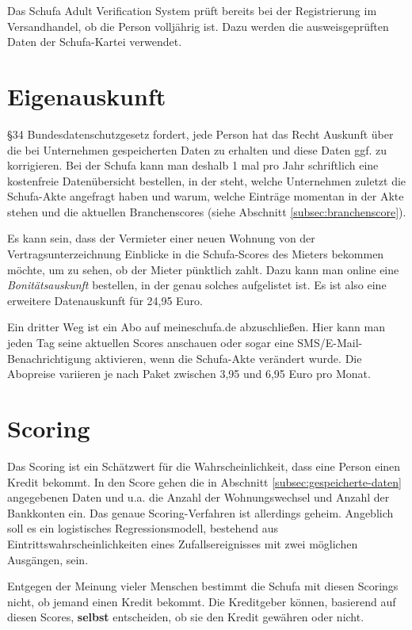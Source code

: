 \documentclass[12pt]{article}
\begin{document}
Das Schufa Adult Verification System prüft bereits bei der Registrierung im Versandhandel, ob die Person volljährig ist. Dazu werden die ausweisgeprüften Daten der Schufa-Kartei verwendet.




\section{Eigenauskunft}
\label{sec:eigenauskunft}
§34 Bundesdatenschutzgesetz fordert, jede Person hat das Recht Auskunft über die bei Unternehmen gespeicherten Daten zu erhalten und diese Daten ggf. zu korrigieren.
Bei der Schufa kann man deshalb 1 mal pro Jahr schriftlich eine kostenfreie Datenübersicht bestellen, in der steht, welche Unternehmen zuletzt die Schufa-Akte angefragt haben und warum, welche Einträge momentan 
in der Akte stehen und die aktuellen Branchenscores (siehe Abschnitt \ref{subsec:branchenscore}).

Es kann sein, dass der Vermieter einer neuen Wohnung von der Vertragsunterzeichnung Einblicke in die Schufa-Scores des Mieters bekommen möchte, um zu sehen, ob der Mieter pünktlich zahlt.
Dazu kann man online eine \textit{Bonitätsauskunft} bestellen, in der genau solches aufgelistet ist. Es ist also eine erweitere Datenauskunft für 24,95 Euro.

Ein dritter Weg ist ein Abo auf meineschufa.de abzuschließen. Hier kann man jeden Tag seine aktuellen Scores anschauen oder sogar eine SMS/E-Mail-Benachrichtigung aktivieren, wenn die Schufa-Akte 
verändert wurde.
Die Abopreise variieren je nach Paket zwischen 3,95 und 6,95 Euro pro Monat.






\section{Scoring}
\label{sec:scoring}
Das Scoring ist ein Schätzwert für die Wahrscheinlichkeit, dass eine Person einen Kredit bekommt.
In den Score gehen die in Abschnitt \ref{subsec:gespeicherte-daten} angegebenen Daten und u.a. die Anzahl der Wohnungswechsel und Anzahl der Bankkonten ein.
Das genaue Scoring-Verfahren ist allerdings geheim. Angeblich soll es ein logistisches Regressionsmodell,
bestehend aus Eintrittswahrscheinlichkeiten eines Zufallsereignisses mit zwei möglichen Ausgängen, sein.

Entgegen der Meinung vieler Menschen bestimmt die Schufa mit diesen Scorings nicht, ob jemand einen Kredit bekommt. Die Kreditgeber können, basierend auf diesen Scores, \textbf{selbst}
entscheiden, ob sie den Kredit gewähren oder nicht.
\end{document}
